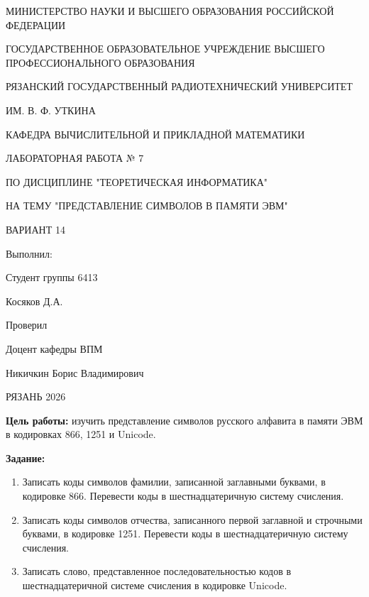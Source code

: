 \documentclass[a4paper, 12pt]{article}
\begin{document}
\begin{center}
    МИНИСТЕРСТВО НАУКИ И ВЫСШЕГО ОБРАЗОВАНИЯ РОССИЙСКОЙ ФЕДЕРАЦИИ

    ГОСУДАРСТВЕННОЕ ОБРАЗОВАТЕЛЬНОЕ УЧРЕЖДЕНИЕ ВЫСШЕГО ПРОФЕССИОНАЛЬНОГО ОБРАЗОВАНИЯ

    РЯЗАНСКИЙ ГОСУДАРСТВЕННЫЙ РАДИОТЕХНИЧЕСКИЙ УНИВЕРСИТЕТ

    ИМ. В. Ф. УТКИНА

    КАФЕДРА ВЫЧИСЛИТЕЛЬНОЙ И ПРИКЛАДНОЙ МАТЕМАТИКИ
\end{center}

\vspace{5 cm}

\begin{center}
    ЛАБОРАТОРНАЯ РАБОТА № 7

    ПО ДИСЦИПЛИНЕ "ТЕОРЕТИЧЕСКАЯ ИНФОРМАТИКА"

    НА ТЕМУ "ПРЕДСТАВЛЕНИЕ СИМВОЛОВ В ПАМЯТИ ЭВМ"

    ВАРИАНТ 14

\end{center}

\vspace{7 cm}

\begin{flushright}
    Выполнил:

    Студент группы 6413

    Косяков Д.А.

    Проверил

    Доцент кафедры ВПМ

    Никичкин Борис Владимирович
\end{flushright}

\begin{center}
    РЯЗАНЬ 2026
\end{center}

\pagebreak

\textbf{ Цель работы:} изучить представление символов русского алфавита в памяти ЭВМ в кодировках 866, 1251 и Unicode.

\textbf{ Задание:}
\begin{enumerate}[nosep]
    \item Записать коды символов фамилии, записанной заглавными буквами, в кодировке 866.
    Перевести коды в шестнадцатеричную систему счисления.
    \item Записать коды символов отчества, записанного первой заглавной и строчными буквами,
    в кодировке 1251. Перевести коды в шестнадцатеричную систему счисления.
    \item Записать слово, представленное последовательностью кодов в шестнадцатеричной системе
    счисления в кодировке Unicode.
\end{enumerate}
\end{document}
